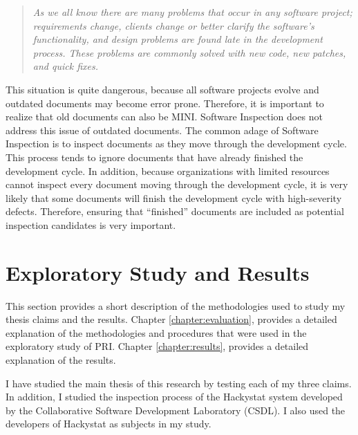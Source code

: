 \begin{quotation}
  \textit{As we all know there are many problems that occur in any software
    project; requirements change, clients change or better clarify the
    software's functionality, and design problems are found late in the
    development process. These problems are commonly solved with new code,
    new patches, and quick fixes.}
\end{quotation}


This situation is quite dangerous, because all software projects evolve and
outdated documents may become error prone. Therefore, it is important to
realize that old documents can also be MINI. Software Inspection
\cite{Gilb93} does not address this issue of outdated documents. The common
adage of Software Inspection is to inspect documents as they move through
the development cycle. This process tends to ignore documents that have
already finished the development cycle. In addition, because organizations
with limited resources cannot inspect every document moving through the
development cycle, it is very likely that some documents will finish the
development cycle with high-severity defects. Therefore, ensuring that
``finished'' documents are included as potential inspection candidates is
very important.




\section{Exploratory Study and Results}
This section provides a short description of the methodologies used to
study my thesis claims and the results. Chapter \ref{chapter:evaluation},
provides a detailed explanation of the methodologies and procedures that
were used in the exploratory study of PRI.  Chapter \ref{chapter:results},
provides a detailed explanation of the results.

I have studied the main thesis of this research by testing each of my three
claims. In addition, I studied the inspection process of the Hackystat
system developed by the Collaborative Software Development Laboratory
(CSDL). I also used the developers of Hackystat as subjects in my study.

